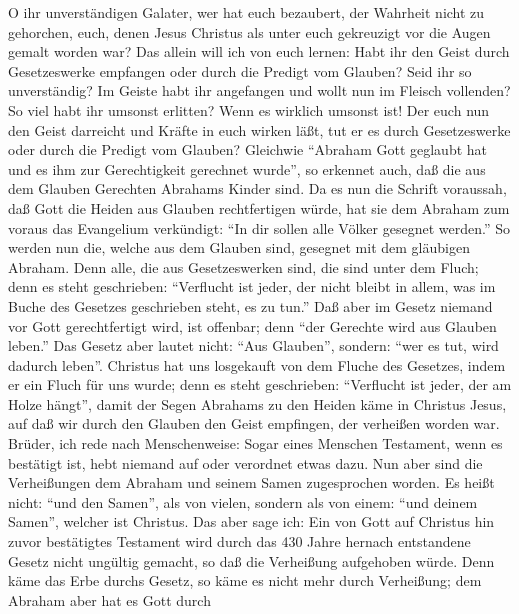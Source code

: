  O ihr unverständigen Galater, wer hat euch bezaubert, der
Wahrheit nicht zu gehorchen, euch, denen Jesus Christus als unter euch
gekreuzigt vor die Augen gemalt worden war?  Das allein
will ich von euch lernen: Habt ihr den Geist durch Gesetzeswerke
empfangen oder durch die Predigt vom Glauben?  Seid ihr so
unverständig? Im Geiste habt ihr angefangen und wollt nun im Fleisch
vollenden?  So viel habt ihr umsonst erlitten? Wenn es
wirklich umsonst ist!  Der euch nun den Geist darreicht
und Kräfte in euch wirken läßt, tut er es durch Gesetzeswerke oder durch
die Predigt vom Glauben?  Gleichwie ``Abraham Gott
geglaubt hat und es ihm zur Gerechtigkeit gerechnet wurde'',
 so erkennet auch, daß die aus dem Glauben Gerechten
Abrahams Kinder sind.  Da es nun die Schrift voraussah,
daß Gott die Heiden aus Glauben rechtfertigen würde, hat sie dem Abraham
zum voraus das Evangelium verkündigt: ``In dir sollen alle Völker
gesegnet werden.''  So werden nun die, welche aus dem
Glauben sind, gesegnet mit dem gläubigen Abraham.  Denn
alle, die aus Gesetzeswerken sind, die sind unter dem Fluch; denn es
steht geschrieben: ``Verflucht ist jeder, der nicht bleibt in allem, was
im Buche des Gesetzes geschrieben steht, es zu tun.'' 
Daß aber im Gesetz niemand vor Gott gerechtfertigt wird, ist offenbar;
denn ``der Gerechte wird aus Glauben leben.''  Das Gesetz
aber lautet nicht: ``Aus Glauben'', sondern: ``wer es tut, wird dadurch
leben''.  Christus hat uns losgekauft von dem Fluche des
Gesetzes, indem er ein Fluch für uns wurde; denn es steht geschrieben:
``Verflucht ist jeder, der am Holze hängt'',  damit der
Segen Abrahams zu den Heiden käme in Christus Jesus, auf daß wir durch
den Glauben den Geist empfingen, der verheißen worden war.
 Brüder, ich rede nach Menschenweise: Sogar eines
Menschen Testament, wenn es bestätigt ist, hebt niemand auf oder
verordnet etwas dazu.  Nun aber sind die Verheißungen dem
Abraham und seinem Samen zugesprochen worden. Es heißt nicht: ``und den
Samen'', als von vielen, sondern als von einem: ``und deinem Samen'',
welcher ist Christus.  Das aber sage ich: Ein von Gott
auf Christus hin zuvor bestätigtes Testament wird durch das 430 Jahre
hernach entstandene Gesetz nicht ungültig gemacht, so daß die Verheißung
aufgehoben würde.  Denn käme das Erbe durchs Gesetz, so
käme es nicht mehr durch Verheißung; dem Abraham aber hat es Gott durch
